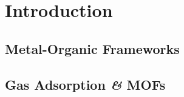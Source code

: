 \chapter{Introduction}

\section{Metal-Organic Frameworks}

\section{Gas Adsorption \textit{\&} MOFs}
